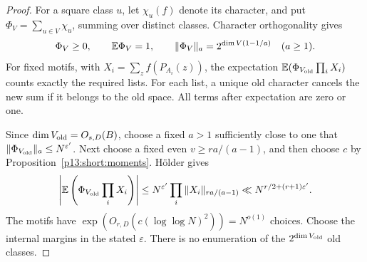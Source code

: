 \begin{proof}
For a square class \(u\), let \(\chi_u(f)\) denote its
character, and put \(\Phi_V=\sum_{u\in V}\chi_u\), summing
over distinct classes. Character orthogonality gives
\[
 \Phi_V\ge0,\qquad \mathbb E\Phi_V=1,\qquad
 \|\Phi_V\|_a=2^{\dim V(1-1/a)}\quad(a\ge1).
\]
For fixed motifs, with \(X_i=\sum_z f(P_{A_i}(z))\),
the expectation \(\mathbb E(\Phi_{V_{\rm old}}\prod_iX_i)\)
counts exactly the required lists. For each list, a unique
old character cancels the new sum if it belongs to the old
space. All terms after expectation are zero or one.

Since \(\dim V_{\rm old}=O_{s,D}(B)\), choose a fixed
\(a>1\) sufficiently close to one that
\(\|\Phi_{V_{\rm old}}\|_a\le N^{\varepsilon'}\).
Next choose a fixed even \(v\ge ra/(a-1)\), and then choose
\(c\) by Proposition~\ref{p13:short:moments}.
H\"older gives
\[
 \left|\mathbb E\left(\Phi_{V_{\rm old}}\prod_iX_i\right)\right|
 \le N^{\varepsilon'}\prod_i
       \|X_i\|_{ra/(a-1)}
 \ll N^{r/2+(r+1)\varepsilon'}.
\]
The motifs have
\(\exp(O_{r,D}(c(\log\log N)^2))=N^{o(1)}\) choices.
Choose the internal margins in the stated \(\varepsilon\).
There is no enumeration of the \(2^{\dim V_{\rm old}}\)
old classes.
\end{proof}
